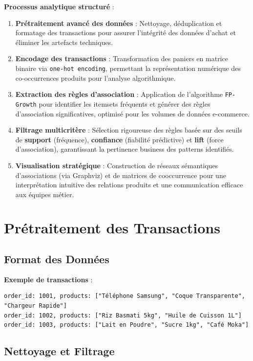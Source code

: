 \documentclass[a4paper,12pt]{article}
\begin{document}
\textbf{Processus analytique structuré} :
\begin{enumerate}
    \item \textbf{Prétraitement avancé des données} : Nettoyage, déduplication et formatage des transactions pour assurer l'intégrité des données d'achat et éliminer les artefacts techniques.
    
    \item \textbf{Encodage des transactions} : Transformation des paniers en matrice binaire via \texttt{one-hot encoding}, permettant la représentation numérique des co-occurrences produits pour l'analyse algorithmique.
    
    \item \textbf{Extraction des règles d'association} : Application de l'algorithme \texttt{FP-Growth} pour identifier les itemsets fréquents et générer des règles d'association significatives, optimisé pour les volumes de données e-commerce.
    
    \item \textbf{Filtrage multicritère} : Sélection rigoureuse des règles basée sur des seuils de \textbf{support} (fréquence), \textbf{confiance} (fiabilité prédictive) et \textbf{lift} (force d'association), garantissant la pertinence business des patterns identifiés.
    
    \item \textbf{Visualisation stratégique} : Construction de réseaux sémantiques d'associations (via Graphviz) et de matrices de cooccurrence pour une interprétation intuitive des relations produits et une communication efficace aux équipes métier.
\end{enumerate}


\section{Prétraitement des Transactions}
\subsection{Format des Données}
\textbf{Exemple de transactions} :
\begin{verbatim}
order_id: 1001, products: ["Téléphone Samsung", "Coque Transparente", "Chargeur Rapide"]
order_id: 1002, products: ["Riz Basmati 5kg", "Huile de Cuisson 1L"]
order_id: 1003, products: ["Lait en Poudre", "Sucre 1kg", "Café Moka"]
\end{verbatim}
\subsection{Nettoyage et Filtrage}
\end{document}

